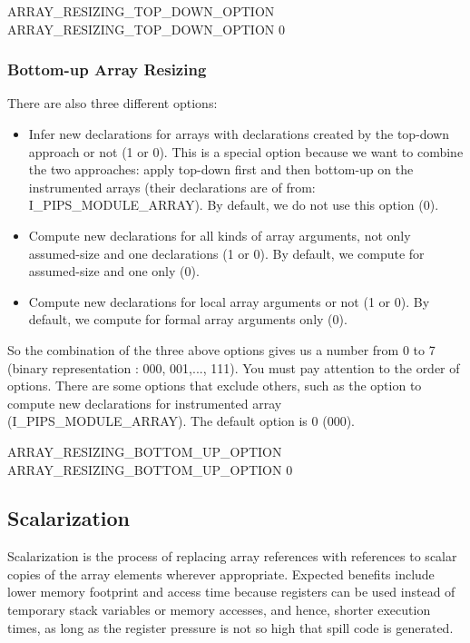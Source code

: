 \documentclass[a4paper]{report}
\newenvironment{PipsPass}[1]{\label{pass:#1}}{}
\begin{document}
\begin{PipsProp}{ARRAY_RESIZING_TOP_DOWN_OPTION}
ARRAY_RESIZING_TOP_DOWN_OPTION 0
\end{PipsProp}

\subsubsection*{Bottom-up Array Resizing}

There are also three different options:
\begin{itemize}
\item Infer new declarations for arrays with declarations created by the
  top-down approach or not (1 or 0). This is a special option because we
  want to combine the two approaches: apply top-down first and then
  bottom-up on the instrumented arrays (their declarations are of from:
  I\_PIPS\_MODULE\_ARRAY). By default, we do not use this option (0).
\item Compute new declarations for all kinds of array arguments,
  not only assumed-size and one declarations (1 or 0). By default, we
  compute for assumed-size and one only (0).
\item Compute new declarations for local array arguments or not (1 or 0). By default, we
  compute for formal array arguments only (0).
\end{itemize}
So the combination of the three above options gives us a number from 0 to
7 (binary representation : 000, 001,..., 111). You must pay attention to
the order of options. There are some options that exclude others, such as
the option to compute new declarations for instrumented array
(I\_PIPS\_MODULE\_ARRAY). The default option is 0
(000).

\begin{PipsProp}{ARRAY_RESIZING_BOTTOM_UP_OPTION}
ARRAY_RESIZING_BOTTOM_UP_OPTION 0
\end{PipsProp}


\subsection{Scalarization}

\begin{PipsPass}{scalarization}
  Scalarization is the process of replacing array references with
  references to scalar copies of the array elements wherever
  appropriate. Expected benefits include lower memory footprint and
  access time because registers can be used instead of temporary stack
  variables or memory accesses, and hence, shorter execution times, as
  long as the register pressure is not so high that spill code is
  generated.
\end{PipsPass}
\end{document}
